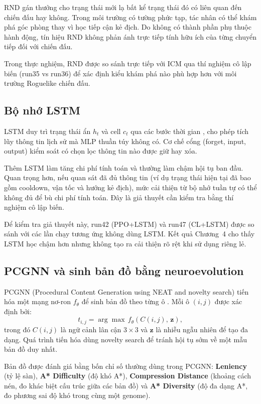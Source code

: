 RND gán thưởng cho trạng thái mới lạ bất kể trạng thái đó có liên quan đến chiến đấu hay không. Trong môi trường có tường phức tạp, tác nhân có thể khám phá góc phòng thay vì học tiếp cận kẻ địch. Do không có thành phần phụ thuộc hành động, tín hiệu RND không phản ánh trực tiếp tính hữu ích của từng chuyển tiếp đối với chiến đấu.

Trong thực nghiệm, RND được so sánh trực tiếp với ICM qua thí nghiệm cô lập biến (run35 vs run36) để xác định kiểu khám phá nào phù hợp hơn với môi trường Roguelike chiến đấu.

\subsection{Bộ nhớ LSTM}

LSTM duy trì trạng thái ẩn $h_t$ và cell $c_t$ qua các bước thời gian \cite{Hochreiter1997}, cho phép tích lũy thông tin lịch sử mà MLP thuần túy không có. Cơ chế cổng (forget, input, output) kiểm soát có chọn lọc thông tin nào được giữ hay xóa.

Thêm LSTM làm tăng chi phí tính toán và thường làm chậm hội tụ ban đầu. Quan trọng hơn, nếu quan sát đã đủ thông tin (ví dụ trạng thái hiện tại đã bao gồm cooldown, vận tốc và hướng kẻ địch), mức cải thiện từ bộ nhớ tuần tự có thể không đủ để bù chi phí tính toán. Đây là giả thuyết cần kiểm tra bằng thí nghiệm cô lập biến.

Để kiểm tra giả thuyết này, run42 (PPO+LSTM) và run47 (CL+LSTM) được so sánh với các lần chạy tương ứng không dùng LSTM. Kết quả Chương~4 cho thấy LSTM học chậm hơn nhưng không tạo ra cải thiện rõ rệt khi sử dụng riêng lẻ.

\subsection{PCGNN và sinh bản đồ bằng neuroevolution}

PCGNN (Procedural Content Generation using NEAT and novelty search) tiến hóa một mạng nơ-ron $f_\theta$ để sinh bản đồ theo từng ô \cite{Beukman2022}. Mỗi ô $(i,j)$ được xác định bởi:
\begin{equation}
    t_{i,j} = \arg\max\, f_\theta(C(i,j),\, \mathbf{z}),
\end{equation}
trong đó $C(i,j)$ là ngữ cảnh lân cận $3\times3$ và $\mathbf{z}$ là nhiễu ngẫu nhiên để tạo đa dạng. Quá trình tiến hóa dùng novelty search để tránh hội tụ sớm về một mẫu bản đồ duy nhất.

Bản đồ được đánh giá bằng bốn chỉ số thường dùng trong PCGNN: \textbf{Leniency} (tỷ lệ sàn), \textbf{A* Difficulty} (độ khó A*), \textbf{Compression Distance} (khoảng cách nén, đo khác biệt cấu trúc giữa các bản đồ) và \textbf{A* Diversity} (độ đa dạng A*, đo phương sai độ khó trong cùng một genome).

